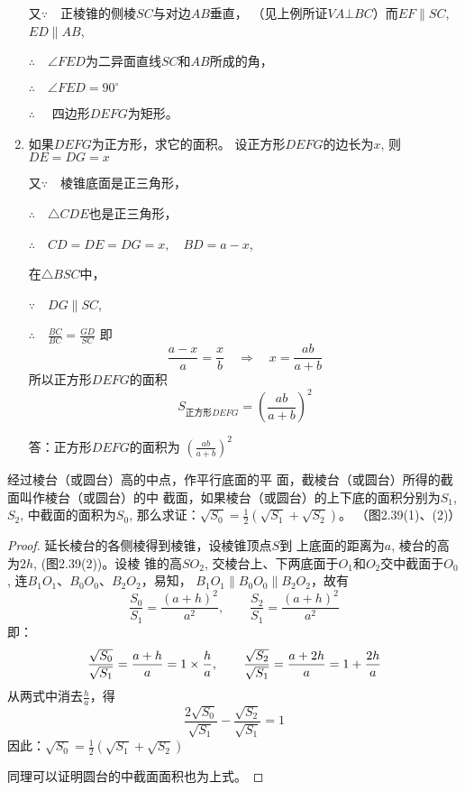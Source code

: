 \begin{solution}
\begin{enumerate}
又$\because\quad $正棱锥的侧棱$SC$与对边$AB$垂直，
（见上例所证$VA\bot BC$）而$EF\parallel SC$, $ED\parallel AB$,

$\therefore\quad \angle FED$为二异面直线$SC$和$AB$所成的角，

$\therefore\quad \angle FED=90^{\circ}$

$\therefore\quad $ 四边形$DEFG$为矩形。

\item 如果$DEFG$为正方形，求它的面积。
设正方形$DEFG$的边长为$x$, 则
$DE=DG=x$

又$\because\quad $棱锥底面是正三角形，

$\therefore\quad \triangle  CDE$也是正三角形，

$\therefore\quad CD=DE=DG=x,\quad BD=a-x$,

在$\triangle BSC$中，

$\because\quad DG\parallel SC$,

$\therefore\quad \frac{BC}{BC}=\frac{GD}{SC}$
即
\[\frac{a-x}{a}=\frac{x}{b}\quad \Rightarrow\quad x=\frac{ab}{a+b}\]
所以正方形$DEFG$的面积
\[S_{\text{正方形}DEFG}=\left(\frac{ab}{a+b}\right)^2\]

答：正方形$DEFG$的面积为
$\left(\frac{ab}{a+b}\right)^2$
\end{enumerate}
\end{solution}

\begin{example}
    经过棱台（或圆台）高的中点，作平行底面的平
面，截棱台（或圆台）所得的截面叫作棱台（或圆台）的中
截面，如果棱台（或圆台）的上下底的面积分别为$S_1$, $S_2$,
中截面的面积为$S_0$, 那么求证：$\sqrt{S_0}=\frac{1}{2}\left(\sqrt{S_1}+\sqrt{S_2}\right)$。
（图2.39(1)、(2)）
\end{example}

\begin{proof}
    延长棱台的各侧棱得到棱锥，设棱锥顶点$S$到
    上底面的距离为$a$, 棱台的高为$2h$, (图2.39(2))。设棱
    锥的高$SO_2$, 交棱台上、下两底面于$O_1$和$O_2$交中截面于$O_0$,
    连$B_1O_1$、$B_0O_0$、$B_2O_2$，易知，
$B_1O_1\parallel B_0O_0\parallel B_2O_2$，故有
\[\frac{S_0}{S_1}=\frac{(a+h)^2}{a^2},\qquad \frac{S_2}{S_1}=\frac{(a+h)^2}{a^2}\]
即：
\[\dfrac{\sqrt{S_0}}{\sqrt{S_1}}=\dfrac{a+h}{a}=1\times \dfrac{h}{a},\qquad \dfrac{\sqrt{S_2}}{\sqrt{S_1}}=\dfrac{a+2h}{a}=1+\dfrac{2h}{a}\]
从两式中消去$\frac{h}{a}$，得
\[\frac{2\sqrt{S_0}}{\sqrt{S_1}}-\frac{\sqrt{S_2}}{\sqrt{S_1}}=1\]
因此：$\sqrt{S_0}=\frac{1}{2}\left(\sqrt{S_1}+\sqrt{S_2}\right)$

同理可以证明圆台的中截面面积也为上式。
\end{proof}










